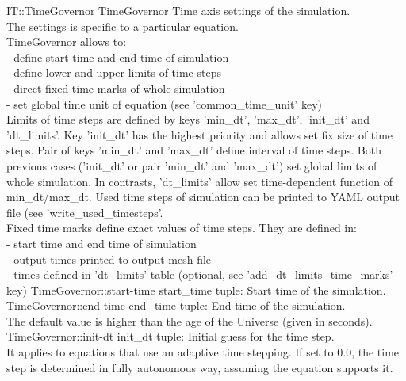 \begin{RecordType}
	{IT::TimeGovernor}
	{TimeGovernor}
	{}%
	{}%
	{{{Time axis settings of the simulation.}\\{
The settings is specific to a particular equation.}\\{
TimeGovernor allows to:}\\{
 - define start time and end time of simulation}\\{
 - define lower and upper limits of time steps}\\{
 - direct fixed time marks of whole simulation}\\{
 - set global time unit of equation (see 'common{\_}time{\_}unit' key)}\\{
Limits of time steps are defined by keys 'min{\_}dt', 'max{\_}dt', 'init{\_}dt' and 'dt{\_}limits'. Key 'init{\_}dt' has the highest priority and allows set fix size of time steps.
Pair of keys 'min{\_}dt' and 'max{\_}dt' define interval of time steps.
Both previous cases ('init{\_}dt' or pair 'min{\_}dt' and 'max{\_}dt') set global limits of whole simulation.
In contrasts, 'dt{\_}limits' allow set time-dependent function of min{\_}dt/max{\_}dt.
Used time steps of simulation can be printed to YAML output file (see 'write{\_}used{\_}timesteps'.}\\{
Fixed time marks define exact values of time steps.
They are defined in:}\\{
 - start time and end time of simulation}\\{
 - output times printed to output mesh file}\\{
 - times defined in 'dt{\_}limits' table (optional, see 'add{\_}dt{\_}limits{\_}time{\_}marks' key)}%
}}
		\RecKey
			{TimeGovernor::start-time}
			{start{\_}time}
			{{tuple: }}{}
			{ }
			{{{Start time of the simulation.}%
}}
		\RecKey
			{TimeGovernor::end-time}
			{end{\_}time}
			{{tuple: }}{}
			{ }
			{{{End time of the simulation.}\\{
The default value is higher than the age of the Universe (given in seconds).}%
}}
		\RecKey
			{TimeGovernor::init-dt}
			{init{\_}dt}
			{{tuple: }}{}
			{ }
			{{{Initial guess for the time step.}\\{
It applies to equations that use an adaptive time stepping.
If set to 0.0, the time step is determined in fully autonomous way, assuming the equation supports it.}%
}}
\end{RecordType}
